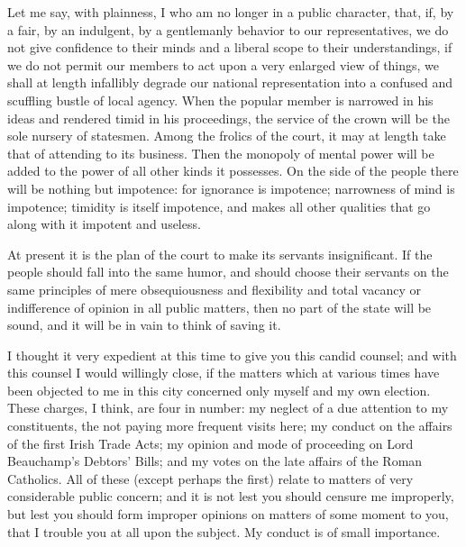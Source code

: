 Let me say, with plainness, I who am no longer in a public character, that, if, by a fair, by an indulgent, by a gentlemanly behavior to our representatives, we do not give confidence to their minds and a liberal scope to their understandings, if we do not permit our members to act upon a very enlarged view of things, we shall at length infallibly degrade our national representation into a confused and scuffling bustle of local agency. When the popular member is narrowed in his ideas and rendered timid in his proceedings, the service of the crown will be the sole nursery of statesmen. Among the frolics of the court, it may at length take that of attending to its business. Then the monopoly of mental power will be added to the power of all other kinds it possesses. On the side of the people there will be nothing but impotence: for ignorance is impotence; narrowness of mind is impotence; timidity is itself impotence, and makes all other qualities that go along with it impotent and useless.

At present it is the plan of the court to make its servants insignificant. If the people should fall into the same humor, and should choose their servants on the same principles of mere obsequiousness and flexibility and total vacancy or indifference of opinion in all public matters, then no part of the state will be sound, and it will be in vain to think of saving it.

I thought it very expedient at this time to give you this candid counsel; and with this counsel I would willingly close, if the matters which at various times have been objected to me in this city concerned only myself and my own election. These charges, I think, are four in number: my neglect of a due attention to my constituents, the not paying more frequent visits here; my conduct on the affairs of the first Irish Trade Acts; my opinion and mode of proceeding on Lord Beauchamp's Debtors' Bills; and my votes on the late affairs of the Roman Catholics. All of these (except perhaps the first) relate to matters of very considerable public concern; and it is not lest you should censure me improperly, but lest you should form improper opinions on matters of some moment to you, that I trouble you at all upon the subject. My conduct is of small importance.

